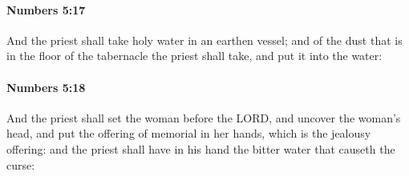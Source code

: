 		\paragraph{Numbers 5:17} %
			\label{NUMBERS-5-17}

			And the priest shall take holy water in an earthen vessel; and of the dust that is in the floor of the tabernacle the priest shall take, and put it into the water:


		\paragraph{Numbers 5:18} %
			\label{NUMBERS-5-18}

			And the priest shall set the woman before the LORD, and uncover the woman’s head, and put the offering of memorial in her hands, which is the jealousy offering: and the priest shall have in his hand the bitter water that causeth the curse:

